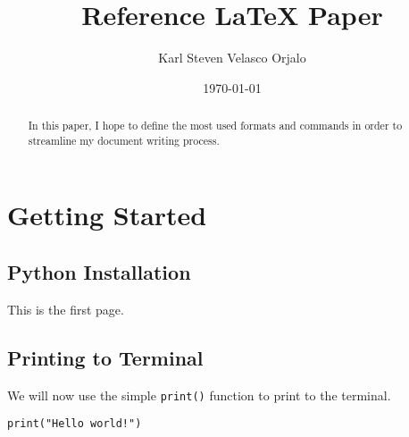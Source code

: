 \documentclass[12pt, letterpaper]{article}
\title{Reference LaTeX Paper}
\author{Karl Steven Velasco Orjalo}
\date{\today}
\begin{document}
  \maketitle
    \begin{abstract}
      In this paper, I hope to define the most used formats and commands in order to 
      streamline my document writing process.
    \end{abstract}
  
  \newpage
    \tableofcontents

  \newpage
    \section{Getting Started}
      \subsection{Python Installation}
        This is the first page.
      \subsection{Printing to Terminal}
        We will now use the simple \texttt{print()} function to print to the terminal.
        \begin{mdframed}[backgroundcolor=bg]
          \begin{verbatim}
print("Hello world!")
          \end{verbatim}
        \end{mdframed}
\end{document}
